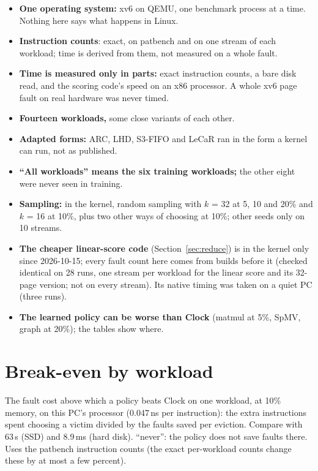 \documentclass[10.5pt,a4paper]{article}
\begin{document}
\begin{itemize}
\item \textbf{One operating system:} xv6 on QEMU, one benchmark process at a time. Nothing here says what happens in Linux.
\item \textbf{Instruction counts}: exact, on patbench and on one stream of each workload; time is derived from them, not measured on a whole fault.
\item \textbf{Time is measured only in parts:} exact instruction counts, a bare disk read, and the scoring code's speed on an x86 processor. A whole xv6 page fault on real hardware was never timed.
\item \textbf{Fourteen workloads,} some close variants of each other.
\item \textbf{Adapted forms:} ARC, LHD, S3-FIFO and LeCaR ran in the form a kernel can run, not as published.
\item \textbf{``All workloads'' means the six training workloads;} the other eight were never seen in training.
\item \textbf{Sampling:} in the kernel, random sampling with $k$ = 32 at 5, 10 and 20\% and $k$ = 16 at 10\%, plus two other ways of choosing at 10\%; other seeds only on 10 streams.
\item \textbf{The cheaper linear-score code} (Section~\ref{sec:reduce}) is in the kernel only since 2026-10-15; every fault count here comes from builds before it (checked identical on 28 runs, one stream per workload for the linear score and its 32-page version; not on every stream). Its native timing was taken on a quiet PC (three runs).
\item \textbf{The learned policy can be worse than Clock} (matmul at 5\%, SpMV, graph at 20\%); the tables show where.
\end{itemize}

\appendix
\section{Break-even by workload}
\label{app:breakeven}

The fault cost above which a policy beats Clock on one workload, at 10\% memory, on this PC's processor (0.047\,ns per instruction): the extra instructions spent choosing a victim divided by the faults saved per eviction.
Compare with 63\,\textmu s (SSD) and 8.9\,ms (hard disk). ``never'': the policy does not save faults there. Uses the patbench instruction counts (the exact per-workload counts change these by at most a few percent).
\end{document}
